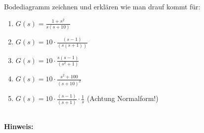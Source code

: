 \begin{question}[section=3,name={Bodediagramm},difficulty=5,type=mdl,tags={}]
	Bodediagramm zeichnen und erklären wie man drauf kommt für:
	\begin{enumerate}
		\item $G(s) = \frac{1+s^2}{s(s+10)}$
		\item $G(s) = 10 \cdot \frac{(s-1)}{(s(s+1))}$
		\item $G(s) = 10 \cdot \frac{s(s-1)}{(s^2+1)}$
		\item $G(s) = 10 \cdot \frac{s^2+100}{(s+10)^2}$
		\item $G(s) = 10 \cdot \frac{(s-1)}{(s+1)} \cdot \frac{1}{s}$ (Achtung Normalform!) 
	\end{enumerate}
	\\ \textbf{Hinweis:}\\
	
\end{question}
\begin{solution}
	
\end{solution}
